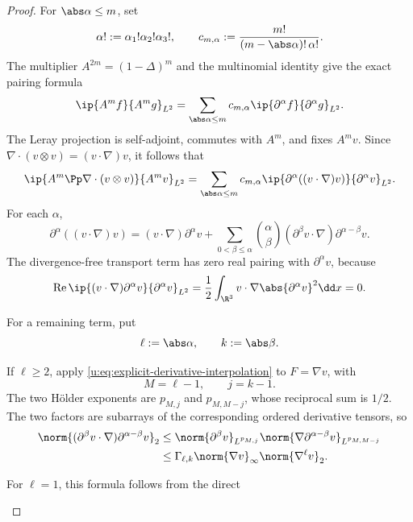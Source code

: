 \begin{proof}
For \(\abs\alpha\le m\), set
\[
 \alpha!:=\alpha_1!\alpha_2!\alpha_3!,
 \qquad
 c_{m,\alpha}:=\frac{m!}{(m-\abs\alpha)!\,\alpha!}.
\]
The multiplier \(A^{2m}=(1-\Delta)^m\) and the multinomial identity give the
exact pairing formula
\begin{equation}
 \ip{A^mf}{A^mg}_{L^2}
 =\sum_{\abs\alpha\le m}c_{m,\alpha}
   \ip{\partial^\alpha f}{\partial^\alpha g}_{L^2}.
 \label{u:eq:integer-Am-pairing}
\end{equation}
The Leray projection is self-adjoint, commutes with \(A^m\), and fixes
\(A^mv\).  Since
\(\nabla\cdot(v\otimes v)=(v\cdot\nabla)v\), it follows that
\begin{equation}
 \ip{A^m\Pp\nabla\cdot(v\otimes v)}{A^mv}_{L^2}
 =\sum_{\abs\alpha\le m}c_{m,\alpha}
   \ip{\partial^\alpha((v\cdot\nabla)v)}
      {\partial^\alpha v}_{L^2}.
 \label{u:eq:integer-projected-pairing}
\end{equation}
For each \(\alpha\),
\[
 \partial^\alpha((v\cdot\nabla)v)
 =(v\cdot\nabla)\partial^\alpha v
 +\sum_{0<\beta\le\alpha}\binom\alpha\beta
 (\partial^\beta v\cdot\nabla)
 \partial^{\alpha-\beta}v.
\]
The divergence-free transport term has zero real pairing with
\(\partial^\alpha v\), because
\[
 \operatorname{Re}\ip{(v\cdot\nabla)\partial^\alpha v}
 {\partial^\alpha v}_{L^2}
 =\frac12\int_{\R^3}v\cdot\nabla
   \abs{\partial^\alpha v}^2\dd x=0.
\]
\begin{samepage}
For a remaining term, put
\[
 \ell:=\abs\alpha,
 \qquad k:=\abs\beta.
\]
\par
\end{samepage}
\begin{samepage}
If \(\ell\ge2\), apply
\eqref{u:eq:explicit-derivative-interpolation} to \(F=\nabla v\), with
\[
 M=\ell-1,
 \qquad j=k-1.
\]
The two H\"older exponents are \(p_{M,j}\) and \(p_{M,M-j}\), whose
reciprocal sum is \(1/2\).  The two factors are subarrays of the corresponding
ordered derivative tensors, so
\begin{align}
 \norm{(\partial^\beta v\cdot\nabla)
          \partial^{\alpha-\beta}v}_2
 &\le
 \norm{\partial^\beta v}_{L^{p_{M,j}}}
 \norm{\nabla\partial^{\alpha-\beta}v}_{L^{p_{M,M-j}}}\notag\\
 &\le\Gamma_{\ell,k}\norm{\nabla v}_\infty
       \norm{\nabla^\ell v}_2.
 \label{u:eq:explicit-commutator-product}
\end{align}
\par
\end{samepage}
\begin{samepage}
For \(\ell=1\), this formula follows from the direct

\end{samepage}
\end{proof}
